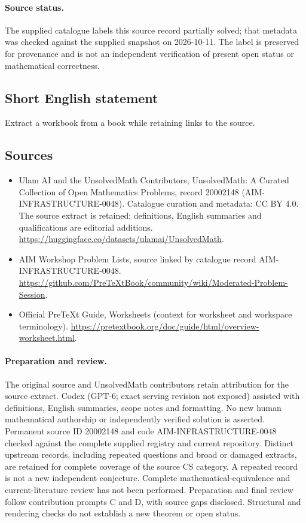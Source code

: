 \documentclass[11pt]{article}
\begin{document}
\paragraph{Source status.}
The supplied catalogue labels this source record partially solved; that metadata was checked against the supplied snapshot on 2026-10-11. The label is preserved for provenance and is not an independent verification of present open status or mathematical correctness.
\subsection{Short English statement}
Extract a workbook from a book while retaining links to the source.
\subsection{Sources}
\begin{itemize}
\item[\hypertarget{source:20002148:1}{S1}] Ulam AI and the UnsolvedMath Contributors, UnsolvedMath: A Curated Collection of Open Mathematics Problems, record 20002148 (AIM-INFRASTRUCTURE-0048). Catalogue curation and metadata: CC BY 4.0. The source extract is retained; definitions, English summaries and qualifications are editorial additions.
\url{https://huggingface.co/datasets/ulamai/UnsolvedMath}.
\item[\hypertarget{source:20002148:2}{S2}] AIM Workshop Problem Lists, source linked by catalogue record AIM-INFRASTRUCTURE-0048.
\url{https://github.com/PreTeXtBook/community/wiki/Moderated-Problem-Session}.
\item[\hypertarget{source:20002148:3}{S3}] Official PreTeXt Guide, Worksheets (context for worksheet and workspace terminology).
\url{https://pretextbook.org/doc/guide/html/overview-worksheet.html}.
\end{itemize}
\paragraph{Preparation and review.}
The original source and UnsolvedMath contributors retain attribution for the source extract. Codex (GPT-6; exact serving revision not exposed) assisted with definitions, English summaries, scope notes and formatting. No new human mathematical authorship or independently verified solution is asserted. Permanent source ID 20002148 and code AIM-INFRASTRUCTURE-0048 checked against the complete supplied registry and current repository. Distinct upstream records, including repeated questions and broad or damaged extracts, are retained for complete coverage of the source CS category. A repeated record is not a new independent conjecture. Complete mathematical-equivalence and current-literature review has not been performed. Preparation and final review follow contribution prompts C and D, with source gaps disclosed. Structural and rendering checks do not establish a new theorem or open status.
\label{end:20002148}
\end{document}
